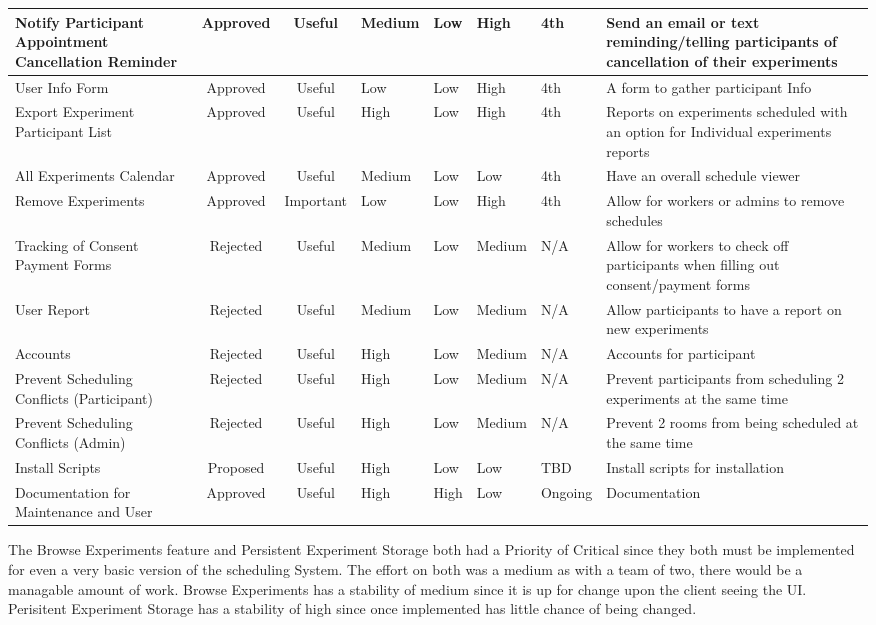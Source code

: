 \begin{table}[!h]
\begin{tabular}{|p{2.5cm}|c|c|p{1.25cm}|p{1cm}|p{1.25cm}|p{1cm}|p{3.75cm}|}
        \hline
         Notify Participant Appointment Cancellation Reminder & Approved & Useful & Medium & Low & High & 4th & Send an email or text reminding/telling participants of cancellation of their experiments \\
        \hline
        User Info Form & Approved & Useful & Low & Low & High & 4th & A form to gather participant Info \\
        \hline
        Export Experiment Participant List & Approved & Useful & High & Low & High & 4th & Reports on experiments scheduled with an option for Individual experiments reports \\
        \hline
        All Experiments Calendar & Approved & Useful & Medium & Low & Low & 4th & Have an overall schedule viewer \\
        \hline
        Remove Experiments & Approved & Important & Low & Low & High & 4th & Allow for workers or admins to remove schedules \\
        \hline
        Tracking of Consent Payment Forms & Rejected & Useful & Medium & Low & Medium & N/A & Allow for workers to check off participants when filling out consent/payment forms \\
        \hline
        User Report & Rejected & Useful & Medium & Low & Medium & N/A & Allow participants to have a report on new experiments \\
        \hline
        Accounts & Rejected & Useful & High & Low & Medium & N/A & Accounts for participant \\
        \hline
        Prevent Scheduling Conflicts (Participant) & Rejected & Useful & High & Low & Medium & N/A & Prevent participants from scheduling 2 experiments at the same time \\
        \hline
        Prevent Scheduling Conflicts (Admin) & Rejected & Useful & High & Low & Medium & N/A & Prevent 2 rooms from being scheduled at the same time \\
        \hline
        Install Scripts & Proposed & Useful & High & Low & Low & TBD & Install scripts for installation \\
        \hline
        Documentation for Maintenance and User & Approved & Useful & High & High & Low & Ongoing & Documentation \\
        \hline
    \end{tabular}
\end{table}
\clearpage

The Browse Experiments feature and Persistent Experiment Storage both had a Priority of Critical since they both must be implemented for even a very basic version of the scheduling System.  The effort on both was a medium as with a team of two, there would be a managable amount of work.  Browse Experiments has a stability of medium since it is up for change upon the client seeing the UI.  Perisitent Experiment Storage has a stability of high since once implemented has little chance of being changed.

